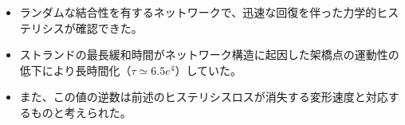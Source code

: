 \begin{columns}[totalwidth=.85\linewidth]
    \column{\textwidth}
    \vspace{-10mm}
        \begin{itemize}
            \item ランダムな結合性を有するネットワークで、迅速な回復を伴った力学的ヒステリシスが確認できた。
            \item ストランドの最長緩和時間がネットワーク構造に起因した架橋点の運動性の低下により長時間化（$\tau \simeq 6.5e^{4}$）していた。
            \item また、この値の逆数は前述のヒステリシスロスが消失する変形速度と対応するものと考えられた。
        \end{itemize}
    \end{columns}